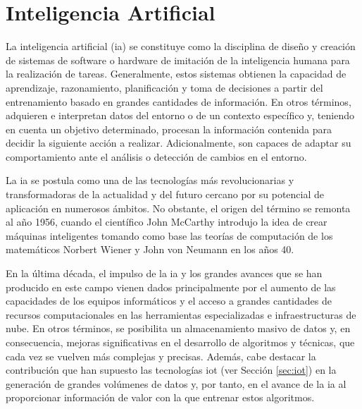 \section{Inteligencia Artificial}
\label{sec:iateoria}

La inteligencia artificial (\gls{ia}) se constituye como la disciplina de diseño y creación de sistemas de software o hardware de imitación de la inteligencia humana para la realización de tareas. Generalmente, estos sistemas obtienen la capacidad de aprendizaje, razonamiento, planificación y toma de decisiones a partir del entrenamiento basado en grandes cantidades de información. En otros términos, adquieren e interpretan datos del entorno o de un contexto específico y, teniendo en cuenta un objetivo determinado, procesan la información contenida para decidir la siguiente acción a realizar. Adicionalmente, son capaces de adaptar su comportamiento ante el análisis o detección de cambios en el entorno. \cite{iagov} \cite{iaazure}

\vspace{3mm}

La \gls{ia} se postula como una de las tecnologías más revolucionarias y transformadoras de la actualidad y del futuro cercano por su potencial de aplicación en numerosos ámbitos. No obstante, el origen del término se remonta al año 1956, cuando el científico John McCarthy introdujo la idea de crear máquinas inteligentes tomando como base las teorías de computación de los matemáticos Norbert Wiener y John von Neumann en los años 40.~\cite{iagov}

\vspace{3mm}

En la última década, el impulso de la \gls{ia} y los grandes avances que se han producido en este campo vienen dados principalmente por el aumento de las capacidades de los equipos informáticos y el acceso a grandes cantidades de recursos computacionales en las herramientas especializadas e infraestructuras de nube. En otros términos, se posibilita un almacenamiento masivo de datos y, en consecuencia, mejoras significativas en el desarrollo de algoritmos y técnicas, que cada vez se vuelven más complejas y precisas. Además, cabe destacar la contribución que han supuesto las tecnologías \gls{iot} (ver Sección \ref{sec:iot}) en la generación de grandes volúmenes de datos y, por tanto, en el avance de la \gls{ia} al proporcionar información de valor con la que entrenar estos algoritmos.

